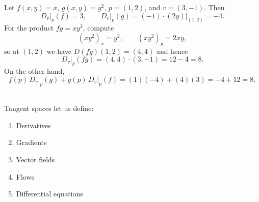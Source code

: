 \begin{example}
Let $f(x,y)=x$, $g(x,y)=y^2$, $p=(1,2)$, and $v=(3,-1)$.
Then
\[
D_v\big|_p(f)=3,
\qquad
D_v\big|_p(g)=(-1)\cdot (2y)\big|_{(1,2)}=-4.
\]
For the product $fg=xy^2$, compute
\[
(xy^2)_x=y^2,\qquad (xy^2)_y=2xy,
\]
so at $(1,2)$ we have $D(fg)(1,2)=(4,4)$ and hence
\[
D_v\big|_p(fg)=(4,4)\cdot(3,-1)=12-4=8.
\]
On the other hand,
\[
f(p)\,D_v\big|_p(g)+g(p)\,D_v\big|_p(f)
=(1)(-4)+(4)(3)=-4+12=8,
\]
\end{example}
~\\
Tangent spaces let us define:
\begin{enumerate}
  \item Derivatives
  \item Gradients
  \item Vector fields
  \item Flows
  \item Differential equations
\end{enumerate}


